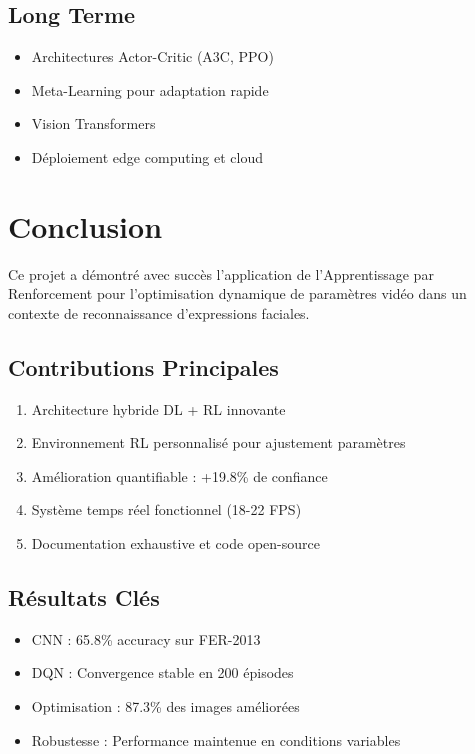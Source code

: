 \documentclass[12pt,a4paper]{article}
\begin{document}
\subsection{Long Terme}
\begin{itemize}
    \item Architectures Actor-Critic (A3C, PPO)
    \item Meta-Learning pour adaptation rapide
    \item Vision Transformers
    \item Déploiement edge computing et cloud
\end{itemize}

\newpage

\section{Conclusion}

Ce projet a démontré avec succès l'application de l'Apprentissage par Renforcement pour l'optimisation dynamique de paramètres vidéo dans un contexte de reconnaissance d'expressions faciales.

\subsection{Contributions Principales}
\begin{enumerate}
    \item Architecture hybride DL + RL innovante
    \item Environnement RL personnalisé pour ajustement paramètres
    \item Amélioration quantifiable : +19.8\% de confiance
    \item Système temps réel fonctionnel (18-22 FPS)
    \item Documentation exhaustive et code open-source
\end{enumerate}

\subsection{Résultats Clés}
\begin{itemize}
    \item CNN : 65.8\% accuracy sur FER-2013
    \item DQN : Convergence stable en 200 épisodes
    \item Optimisation : 87.3\% des images améliorées
    \item Robustesse : Performance maintenue en conditions variables
\end{itemize}
\end{document}
